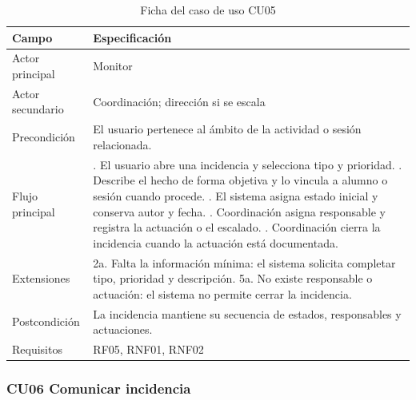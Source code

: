 \begin{table}[H]
\centering\small
\begin{tabularx}{\textwidth}{>{\hsize=0.381\hsize\raggedright\arraybackslash}X>{\hsize=1.619\hsize\raggedright\arraybackslash}X}
\toprule
\rowcolor{cabeceratabla} \textbf{Campo} & \textbf{Especificación} \\
\midrule
Actor principal & Monitor \\
Actor secundario & Coordinación; dirección si se escala \\
Precondición & El usuario pertenece al ámbito de la actividad o sesión relacionada. \\
Flujo principal & 1. El usuario abre una incidencia y selecciona tipo y prioridad. \newline 2. Describe el hecho de forma objetiva y lo vincula a alumno o sesión cuando procede. \newline 3. El sistema asigna estado inicial y conserva autor y fecha. \newline 4. Coordinación asigna responsable y registra la actuación o el escalado. \newline 5. Coordinación cierra la incidencia cuando la actuación está documentada. \\
Extensiones & 2a. Falta la información mínima: el sistema solicita completar tipo, prioridad y descripción. \newline 5a. No existe responsable o actuación: el sistema no permite cerrar la incidencia. \\
Postcondición & La incidencia mantiene su secuencia de estados, responsables y actuaciones. \\
Requisitos & RF05, RNF01, RNF02 \\
\bottomrule
\end{tabularx}
\caption{Ficha del caso de uso CU05}\label{tab:29}
\end{table}

\subsubsection{CU06 Comunicar incidencia}\label{sec:4-1-2-6}

